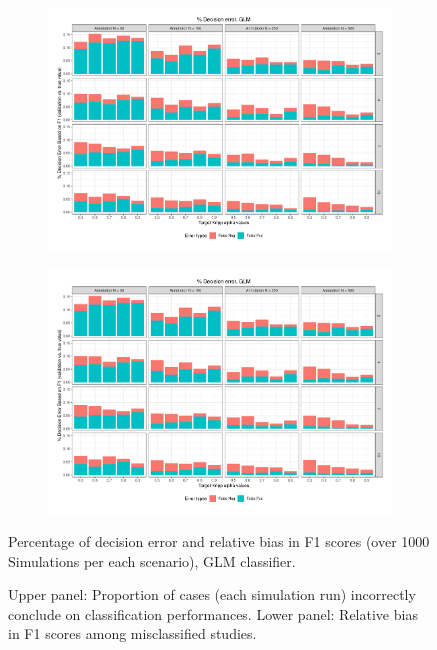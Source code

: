 \documentclass[man, 12pt, a4paper, nolmodern, noextraspace]{apa6}
\begin{document}
\begin{figure}
    \centering
    \begin{subfigure}[t]{0.95\textwidth}
        \centering
        \includegraphics[clip, width=\linewidth, page = 1]{Results/GLM_summary_05.pdf} 
    \end{subfigure}
    \begin{subfigure}[t]{0.95\textwidth}
        \centering
        \includegraphics[clip, width=\linewidth, page = 2]{Results/GLM_summary_05.pdf} 
    \end{subfigure}
    
    \captionsetup{format=hang}
    \caption{Percentage of decision error and relative bias in F1 scores (over 1000 Simulations per each scenario), GLM classifier.} 
    \label{fig:Figure3}
    \captionsetup{font=small}
    \caption*{Upper panel: Proportion of cases (each simulation run) incorrectly conclude on classification performances. Lower panel: Relative bias in F1 scores among misclassified studies.}
\end{figure}     
\end{document}

